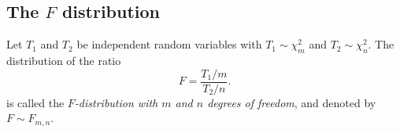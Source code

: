 %
%
%
%
%
%
%
%

\subsection{The $F$ distribution}
\begin{definition}
Let $T_1$ and $T_2$ be independent random variables with $T_1\sim\chi^2_m$ and $T_2\sim\chi^2_n$. The distribution of the ratio
\[
F = \frac{T_1/m}{T_2/n}.
\]
is called the \emph{$F$-distribution with $m$ and $n$ degrees of freedom}, and denoted by $F\sim F_{m,n}$.
\end{definition}

